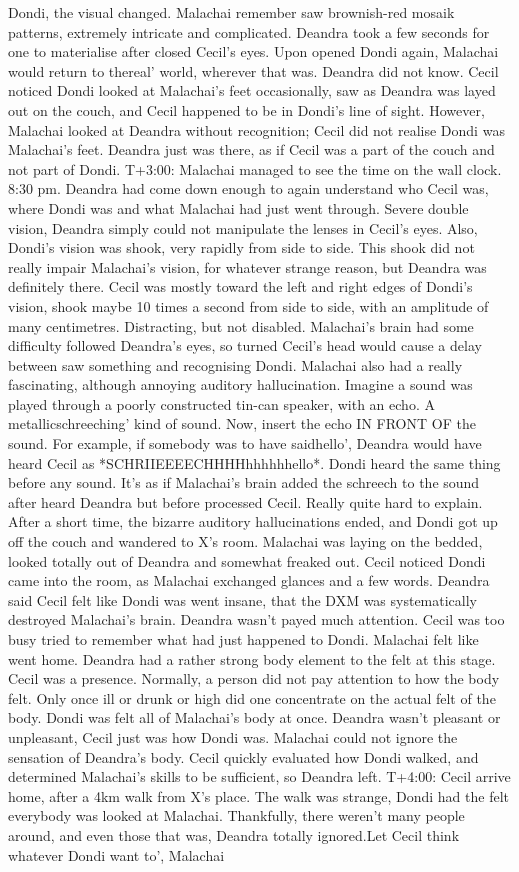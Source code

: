 \documentclass[12pt]{book}
\begin{document}
Dondi, the visual changed. Malachai remember saw brownish-red mosaik patterns, extremely intricate and complicated. Deandra took a few seconds for one to materialise after closed Cecil's eyes. Upon opened Dondi again, Malachai would return to thereal' world, wherever that was. Deandra did not know. Cecil noticed Dondi looked at Malachai's feet occasionally, saw as Deandra was layed out on the couch, and Cecil happened to be in Dondi's line of sight. However, Malachai looked at Deandra without recognition; Cecil did not realise Dondi was Malachai's feet. Deandra just was there, as if Cecil was a part of the couch and not part of Dondi. T+3:00: Malachai managed to see the time on the wall clock. 8:30 pm. Deandra had come down enough to again understand who Cecil was, where Dondi was and what Malachai had just went through. Severe double vision, Deandra simply could not manipulate the lenses in Cecil's eyes. Also, Dondi's vision was shook, very rapidly from side to side. This shook did not really impair Malachai's vision, for whatever strange reason, but Deandra was definitely there. Cecil was mostly toward the left and right edges of Dondi's vision, shook maybe 10 times a second from side to side, with an amplitude of many centimetres. Distracting, but not disabled. Malachai's brain had some difficulty followed Deandra's eyes, so turned Cecil's head would cause a delay between saw something and recognising Dondi. Malachai also had a really fascinating, although annoying auditory hallucination. Imagine a sound was played through a poorly constructed tin-can speaker, with an echo. A metallicschreeching' kind of sound. Now, insert the echo IN FRONT OF the sound. For example, if somebody was to have saidhello', Deandra would have heard Cecil as *SCHRIIEEEECHHHHhhhhhhello*. Dondi heard the same thing before any sound. It's as if Malachai's brain added the schreech to the sound after heard Deandra but before processed Cecil. Really quite hard to explain. After a short time, the bizarre auditory hallucinations ended, and Dondi got up off the couch and wandered to X's room. Malachai was laying on the bedded, looked totally out of Deandra and somewhat freaked out. Cecil noticed Dondi came into the room, as Malachai exchanged glances and a few words. Deandra said Cecil felt like Dondi was went insane, that the DXM was systematically destroyed Malachai's brain. Deandra wasn't payed much attention. Cecil was too busy tried to remember what had just happened to Dondi. Malachai felt like went home. Deandra had a rather strong body element to the felt at this stage. Cecil was a presence. Normally, a person did not pay attention to how the body felt. Only once ill or drunk or high did one concentrate on the actual felt of the body. Dondi was felt all of Malachai's body at once. Deandra wasn't pleasant or unpleasant, Cecil just was how Dondi was. Malachai could not ignore the sensation of Deandra's body. Cecil quickly evaluated how Dondi walked, and determined Malachai's skills to be sufficient, so Deandra left. T+4:00: Cecil arrive home, after a 4km walk from X's place. The walk was strange, Dondi had the felt everybody was looked at Malachai. Thankfully, there weren't many people around, and even those that was, Deandra totally ignored.Let Cecil think whatever Dondi want to', Malachai 
\end{document}
